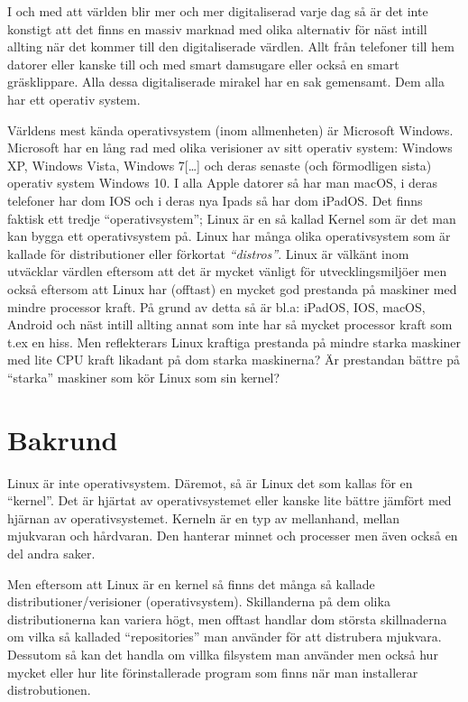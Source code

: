 \documentclass[12pt, a4paper]{report}
\begin{document}
    I och med att världen blir mer och mer digitaliserad varje dag så är det inte konstigt att det finns en massiv marknad med olika alternativ för näst intill allting när det kommer till den digitaliserade värdlen. Allt från telefoner till hem datorer eller kanske till och med smart damsugare eller också en smart gräsklippare. Alla dessa digitaliserade mirakel har en sak gemensamt. Dem alla har ett operativ system.

    Världens mest kända operativsystem (inom allmenheten) är Microsoft Windows. Microsoft har en lång rad med olika verisioner av sitt operativ system\cite{windows}: Windows XP, Windows Vista, Windows 7[\dots] och deras senaste (och förmodligen sista) operativ system Windows 10.
     I alla Apple datorer så har man macOS, i deras telefoner har dom IOS och i deras nya Ipads så har dom iPadOS.
     Det finns faktisk ett tredje ``operativsystem''; Linux är en så kallad Kernel \cite{redhat} som är det man kan bygga ett operativsystem på. Linux har många olika operativsystem som är kallade för distributioner eller förkortat \textit{``distros''}. Linux är välkänt inom utväcklar värdlen eftersom att det är mycket vänligt för utvecklingsmiljöer men också eftersom att Linux har (offtast) en mycket god prestanda på maskiner med mindre processor kraft. På grund av detta så är bl.a: iPadOS, IOS, macOS, Android och näst intill allting annat som inte har så mycket processor kraft som t.ex en hiss. Men reflekterars Linux kraftiga prestanda på mindre starka maskiner med lite CPU kraft likadant på dom starka maskinerna? Är prestandan bättre på ``starka'' maskiner som kör Linux som sin kernel?


\section{Bakrund}

    Linux är inte operativsystem. Däremot, så är Linux det som kallas för en ``kernel''\cite{redhat}. Det är hjärtat av operativsystemet eller kanske lite bättre jämfört med hjärnan av operativsystemet. Kerneln är en typ av mellanhand, mellan mjukvaran och hårdvaran. Den hanterar minnet och processer men även också en del andra saker.

    Men eftersom att Linux är en kernel så finns det många så kallade distributioner/verisioner (operativsystem). Skillanderna på dem olika distributionerna kan variera högt, men offtast handlar dom största skillnaderna om vilka så kalladed ``repositories'' man använder för att distrubera mjukvara. Dessutom så kan det handla om villka filsystem man använder men också hur mycket eller hur lite förinstallerade program som finns när man installerar distrobutionen.
    
\end{document}
